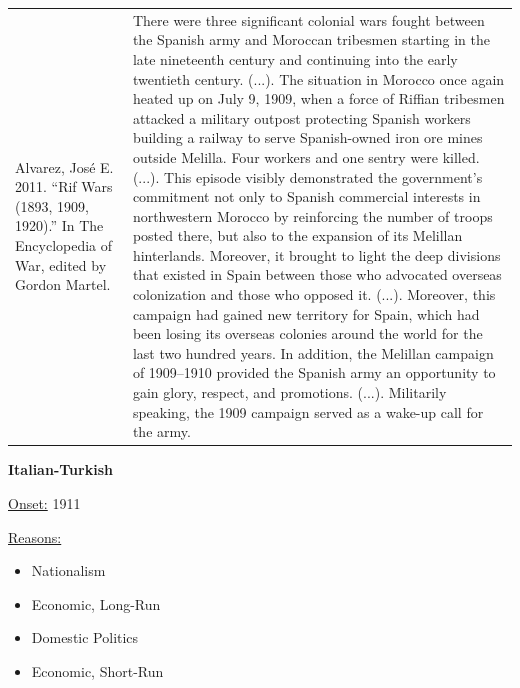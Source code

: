 {\begin{longtable}{p{}p{}}
\\
Alvarez, José E. 2011. “Rif Wars (1893, 1909, 1920).” In The Encyclopedia of War, edited by Gordon Martel. & There were three significant colonial wars fought between the Spanish army and Moroccan tribesmen starting in the late nineteenth century and continuing into the early twentieth century. (...). The situation in Morocco once again heated up on July 9, 1909, when a force of Riffian tribesmen attacked a military outpost protecting Spanish workers building a railway to serve Spanish-owned iron ore mines outside Melilla. Four workers and one sentry were killed. (...). This episode visibly demonstrated the government's commitment not only to Spanish commercial interests in northwestern Morocco by reinforcing the number of troops posted there, but also to the expansion of its Melillan hinterlands. Moreover, it brought to light the deep divisions that existed in Spain between those who advocated overseas colonization and those who opposed it. (...). Moreover, this campaign had gained new territory for Spain, which had been losing its overseas colonies around the world for the last two hundred years. In addition, the Melillan campaign of 1909–1910 provided the Spanish army an opportunity to gain glory, respect, and promotions. (...). Militarily speaking, the 1909 campaign served as a wake-up call for the army.
\\
\end{longtable}}
\clearpage
         \textbf{Italian-Turkish} 

          \underline{Onset:} 1911         

\underline{Reasons:}
\begin{itemize}
\item Nationalism
\item Economic, Long-Run
\item Domestic Politics
\item Economic, Short-Run
\end{itemize}

